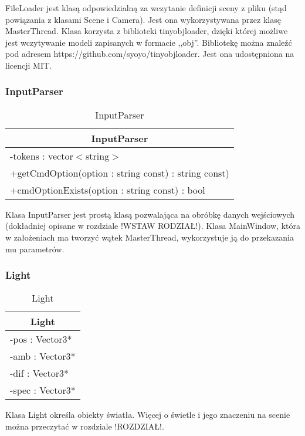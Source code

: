 FileLoader jest klasą odpowiedzialną za wczytanie definicji sceny z pliku (stąd powiązania z klasami Scene i Camera). Jest ona wykorzystywana przez klasę MasterThread. Klasa korzysta z biblioteki tinyobjloader, dzięki której możliwe jest wczytywanie modeli zapisanych w formacie ,,obj''. Bibliotekę można znaleźć pod adresem https://github.com/syoyo/tinyobjloader. Jest ona udostępniona na licencji MIT.

\subsubsection{InputParser}

\footnotesize
\begin{longtable}{|p{14cm}|}
    \caption{InputParser} \label{tab:InputParser} \\ \hline
    \multicolumn{1}{|c|}{InputParser} \\ \hline
    -tokens : vector$<$string$>$  \\ \hline
    +getCmdOption(option : string const) : string const) \\
    +cmdOptionExists(option : string const) : bool \\ \hline
\end{longtable}
\normalsize

Klasa InputParser jest prostą klasą pozwalająca na obróbkę danych wejściowych (dokładniej opisane w rozdziale !WSTAW RODZIAŁ!). Klasa MainWindow, która w założeniach ma tworzyć wątek MasterThread, wykorzystuje ją do przekazania mu parametrów.

\subsubsection{Light}

\footnotesize
\begin{longtable}{|p{14cm}|}
    \caption{Light} \label{tab:Light} \\ \hline
    \multicolumn{1}{|c|}{Light} \\ \hline
    -pos : Vector3* \\ 
    -amb : Vector3* \\
    -dif : Vector3* \\
    -spec : Vector3* \\
	\hline
\end{longtable}
\normalsize

Klasa Light określa obiekty światła. Więcej o świetle i jego znaczeniu na scenie można przeczytać w rozdziale !ROZDZIAŁ!.

